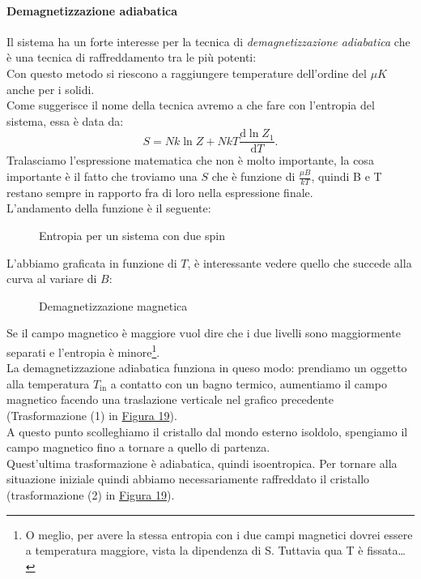 \paragraph{Demagnetizzazione adiabatica}%
Il sistema ha un forte interesse per la tecnica di \textit{demagnetizzazione adiabatica} che è una tecnica di raffreddamento tra le più potenti:\\
Con questo metodo si riescono a raggiungere temperature dell'ordine del $\mu K$ anche per i solidi. \\
Come suggerisce il nome della tecnica avremo a che fare con l'entropia del sistema, essa è data da:
 \[
	S = Nk \ln Z + NkT \frac{\mbox{d} \ln Z_{1}}{\mbox{d} T} 
.\] 
Tralasciamo l'espressione matematica che non è molto importante, la cosa importante è il fatto che troviamo una $S$ che è funzione di $\frac{\mu B}{kT}$, quindi B e T restano sempre in rapporto fra di loro nella espressione finale.\\
L'andamento della funzione è il seguente:
\begin{figure}[H]
    \centering
    \caption{Entropia per un sistema con due spin}
    \label{fig:entropia-per-sistema-con-due-spin}
\end{figure}
\noindent
L'abbiamo graficata in funzione di $T$, è interessante vedere quello che succede alla curva al variare di $B$:
\begin{figure}[H]
    \centering
    \caption{Demagnetizzazione magnetica}
    \label{fig:demagnetizzazione-magnetica}
\end{figure}
\noindent
Se il campo magnetico è maggiore vuol dire che i due livelli sono maggiormente separati e l'entropia è minore\footnote{O meglio, per avere la stessa entropia con i due campi magnetici dovrei essere a temperatura maggiore, vista la dipendenza di S. Tuttavia qua T è fissata\ldots}.\\
La demagnetizzazione adiabatica funziona in queso modo: prendiamo un oggetto alla temperatura $T_{\text{in}}$ a contatto con un bagno termico,  aumentiamo il campo magnetico facendo una traslazione verticale nel grafico precedente (Trasformazione (1) in \hyperref[fig:demagnetizzazione-adiabatica-1]{Figura 19}).\\
A questo punto scolleghiamo il cristallo dal mondo esterno isoldolo, spengiamo il campo magnetico fino a tornare a quello di partenza. \\
Quest'ultima trasformazione è adiabatica, quindi isoentropica. Per tornare alla situazione iniziale quindi abbiamo necessariamente raffreddato il cristallo (trasformazione (2) in \hyperref[fig:demagnetizzazione-adiabatica-1]{Figura 19}).
